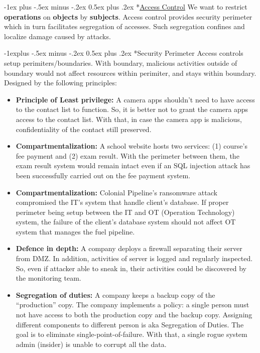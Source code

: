 \documentclass[10pt,landscape]{article}
\makeatletter
\renewcommand{\section}{\@startsection{section}{1}{0mm}%
                                {-1ex plus -.5ex minus -.2ex}%
                                {0.5ex plus .2ex}%
                                {\normalfont\large\bfseries}}
\renewcommand{\subsection}{\@startsection{subsection}{2}{0mm}%
                                {-1explus -.5ex minus -.2ex}%
                                {0.5ex plus .2ex}%
                                {\normalfont\normalsize\bfseries}}
\makeatother
\begin{document}
\begin{multicols*}{3}
\section*{\underline{Access Control}}
We want to restrict \textbf{operations} on \textbf{objects} by \textbf{subjects}. Access control provides security perimeter which in
turn facilitates segregation of accesses. Such segregation confines and localize damage caused by attacks.

\subsection*{Security Perimeter}
Access controls setup perimiters/boundaries. With boundary, malicious activities outside of boundary would not affect resources within perimiter, and stays within boundary. Designed by the following principles:
\begin{itemize}[noitemsep,wide=0pt, leftmargin=\dimexpr{} + 2\relax]
    \item \textbf{Principle of Least privilege: }A camera apps shouldn’t need to have access to the contact list to function. So, it is better not to grant the
    camera apps access to the contact list. With that, in case the camera app is malicious, confidentiality of the
    contact still preserved. 
    \item \textbf{Compartmentalization:} A school website hosts two services: (1) course’s fee payment and (2) exam result. With the perimeter between
    them, the exam result system would remain intact even if an SQL injection attack has been successfully carried
    out on the fee payment system. 
    \item \textbf{Compartmentalization:} Colonial Pipeline’s ransomware attack compromised the IT’s system that handle client’s database. If proper
    perimeter being setup between the IT and OT (Operation Technology) system, the failure of the client’s
    database system should not affect OT system that manages the fuel pipeline.
    \item \textbf{Defence in depth:} A company deploys a firewall separating their server from DMZ. In addition, activities of server is logged and
    regularly inspected. So, even if attacker able to sneak in, their activities could be discovered by the monitoring
    team. 
    \item \textbf{Segregation of duties:} A company keeps a backup copy of the “production” copy. The company implements a policy: a single person
    must not have access to both the production copy and the backup copy. Assigning different components to
    different person is aka Segregation of Duties. The goal is to eliminate single-point-of-failure. With that, a single
    rogue system admin (insider) is unable to corrupt all the data. 
\end{itemize}


\end{multicols*}
\end{document}
